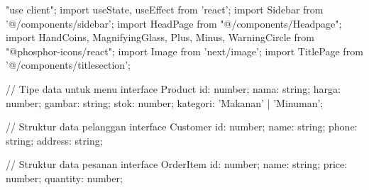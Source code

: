 "use client";
import { useState, useEffect } from 'react';
import Sidebar from '@/components/sidebar';
import HeadPage from "@/components/Headpage";
import { HandCoins, MagnifyingGlass, Plus, Minus, WarningCircle  } from "@phosphor-icons/react";
import Image from 'next/image';
import TitlePage from '@/components/titlesection';

// Tipe data untuk menu
interface Product {
  id: number;
  nama: string;
  harga: number;
  gambar: string;
  stok: number;
  kategori: 'Makanan' | 'Minuman';
}

// Struktur data pelanggan
interface Customer {
  id: number;
  name: string;
  phone: string;
  address: string;
}

// Struktur data pesanan
interface OrderItem {
  id: number;
  name: string;
  price: number;
  quantity: number;
}

